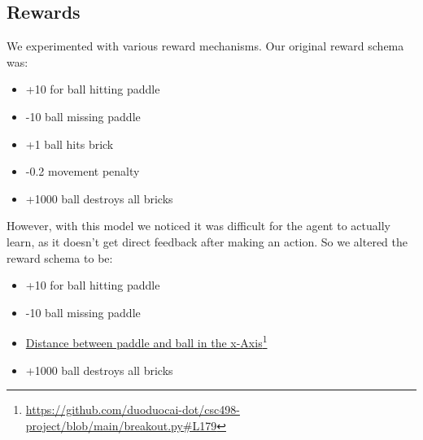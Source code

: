 \documentclass[twoside,11pt]{article}
\newcommand\fnurl[2]{%
  \href{#2}{#1}\footnote{\url{#2}}%
}
\begin{document}
\subsection{Rewards}
We experimented with various reward mechanisms. Our original reward schema was:
\begin{itemize}
\item +10 for ball hitting paddle
\item -10 ball missing paddle
\item +1 ball hits brick
\item -0.2 movement penalty
\item +1000 ball destroys all bricks
\end{itemize}
However, with this model we noticed it was difficult for the agent to actually learn, as it doesn't get direct feedback after making an action. So we altered the reward schema to be:
\begin{itemize}
\item +10 for ball hitting paddle
\item -10 ball missing paddle
\item \fnurl{Distance between paddle and ball in the x-Axis}{https://github.com/duoduocai-dot/csc498-project/blob/main/breakout.py\#L179}
\item +1000 ball destroys all bricks
\end{itemize}
\end{document}
